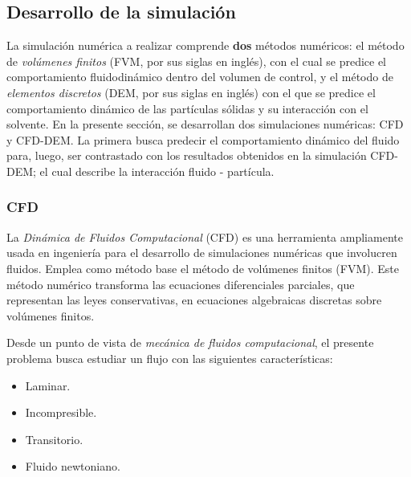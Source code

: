 \newpage

\subsection{Desarrollo de la simulaci\'on}

\noindent
\justify

La simulaci\'on num\'erica a realizar comprende \textbf{dos} m\'etodos num\'ericos: el m\'etodo de \textit{vol\'umenes finitos} (FVM, por sus siglas en ingl\'es), con el cual se predice el comportamiento fluidodin\'amico dentro del volumen de control, y el m\'etodo de \textit{elementos discretos} (DEM, por sus siglas en ingl\'es) con el que se predice el comportamiento din\'amico de las part\'iculas s\'olidas y su interacci\'on con el solvente. En la presente secci\'on, se desarrollan dos simulaciones num\'ericas: CFD y CFD-DEM. La primera busca predecir el comportamiento din\'amico del fluido para, luego, ser contrastado con los resultados obtenidos en la simulaci\'on CFD-DEM; el cual describe la interacci\'on fluido - part\'icula. 

\subsubsection{CFD} \label{CFD:problema}

\noindent
\justify

La \textit{Din\'amica de Fluidos Computacional} (CFD) es una herramienta ampliamente usada en ingenier\'ia para el desarrollo de simulaciones num\'ericas que involucren fluidos. Emplea como m\'etodo base el m\'etodo de vol\'umenes finitos (FVM). Este m\'etodo num\'erico transforma las ecuaciones diferenciales parciales, que representan las leyes conservativas, en ecuaciones algebraicas discretas sobre vol\'umenes finitos.

\noindent
\justify

Desde un punto de vista de \textit{mec\'anica de fluidos computacional}, el presente problema busca estudiar un flujo con las siguientes caracter\'isticas:

\begin{itemize}
	\item Laminar.
	\item Incompresible.
	\item Transitorio.
	\item Fluido newtoniano.
\end{itemize}

\noindent
\justify

